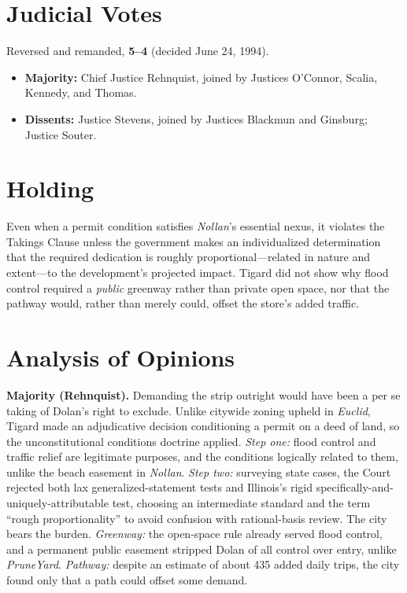 \documentclass[12pt]{article}
\begin{document}
\section{Judicial Votes}

Reversed and remanded, \textbf{5--4} (decided June 24, 1994).
\begin{itemize}
\item \textbf{Majority:} Chief Justice Rehnquist, joined by Justices O'Connor, Scalia, Kennedy, and Thomas.
\item \textbf{Dissents:} Justice Stevens, joined by Justices Blackmun and Ginsburg; Justice Souter.
\end{itemize}

\section{Holding}

Even when a permit condition satisfies \textit{Nollan}'s essential nexus, it violates the Takings Clause unless the government makes an individualized determination that the required dedication is roughly proportional---related in nature and extent---to the development's projected impact. Tigard did not show why flood control required a \emph{public} greenway rather than private open space, nor that the pathway would, rather than merely could, offset the store's added traffic.

\section{Analysis of Opinions}

\textbf{Majority (Rehnquist).} Demanding the strip outright would have been a per se taking of Dolan's right to exclude. Unlike citywide zoning upheld in \textit{Euclid}, Tigard made an adjudicative decision conditioning a permit on a deed of land, so the unconstitutional conditions doctrine applied. \emph{Step one:} flood control and traffic relief are legitimate purposes, and the conditions logically related to them, unlike the beach easement in \textit{Nollan}. \emph{Step two:} surveying state cases, the Court rejected both lax generalized-statement tests and Illinois's rigid specifically-and-uniquely-attributable test, choosing an intermediate standard and the term ``rough proportionality'' to avoid confusion with rational-basis review. The city bears the burden. \emph{Greenway:} the open-space rule already served flood control, and a permanent public easement stripped Dolan of all control over entry, unlike \textit{PruneYard}. \emph{Pathway:} despite an estimate of about 435 added daily trips, the city found only that a path could offset some demand.
\end{document}
